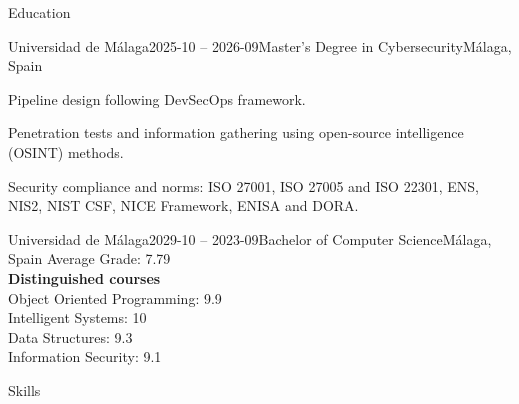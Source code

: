 \documentclass{resume} %
\begin{document}

\begin{rSection}{Education}

\begin{rSubsection}{Universidad de Málaga}{2025-10 -- 2026-09}{Master's Degree in Cybersecurity}{Málaga, Spain}
	\item Pipeline design following DevSecOps framework.
	\item Penetration tests and information gathering using open-source intelligence (OSINT) methods.
	\item Security compliance and norms: ISO 27001, ISO 27005 and ISO 22301, ENS, NIS2, NIST CSF, NICE Framework, ENISA and DORA.
\end{rSubsection}

\begin{rSubsection}{Universidad de Málaga}{2029-10 -- 2023-09}{Bachelor of Computer Science}{Málaga, Spain}
	Average Grade: 7.79 \\
	{\bfseries Distinguished courses} \\
	Object Oriented Programming: 9.9 \\
	Intelligent Systems: 10 \\
	Data Structures: 9.3 \\
	Information Security: 9.1
\end{rSubsection}

\end{rSection}


\begin{rSection}{Skills}
\end{rSection}

\end{document}
